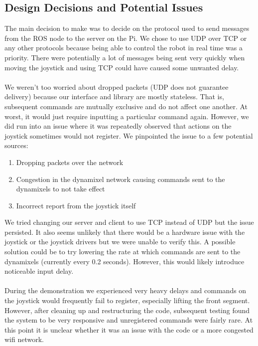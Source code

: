 \documentclass[]{article}
\begin{document}
\subsection{Design Decisions and Potential Issues}
The main decision to make was to decide on the protocol used to send messages from the ROS node to the server on the Pi. We chose to use UDP over TCP or any other protocols because being able to control the robot in real time was a priority. There were potentially a lot of messages being sent very quickly when moving the joystick and using TCP could have caused some unwanted delay.
\\
\\
We weren't too worried about dropped packets (UDP does not guarantee delivery) because our interface and library are mostly stateless. That is, subsequent commands are mutually exclusive and do not affect one another. At worst, it would just require inputting a particular command again. However, we did run into an issue where it was repeatedly observed that actions on the joystick sometimes would not register. We pinpointed the issue to a few potential sources:
\begin{enumerate}
  \item Dropping packets over the network
  \item Congestion in the dynamixel network causing commands sent to the dynamixels to not take effect
  \item Incorrect report from the joystick itself
\end{enumerate}
We tried changing our server and client to use TCP instead of UDP but the issue persisted. It also seems unlikely that there would be a hardware issue with the joystick or the joystick drivers but we were unable to verify this. A possible solution could be to try lowering the rate at which commands are sent to the dynamixels (currently every 0.2 seconds). However, this would likely introduce noticeable input delay.
\\
\\
During the demonstration we experienced very heavy delays and commands on the joystick would frequently fail to register, especially lifting the front segment. However, after cleaning up and restructuring the code, subsequent testing found the system to be very responsive and unregistered commands were fairly rare. At this point it is unclear whether it was an issue with the code or a more congested wifi network.
\end{document}
